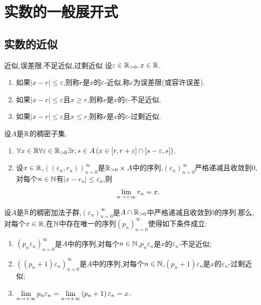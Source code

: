 \chapter{实数的一般展开式}

\section{实数的近似}

\begin{definition}{近似,误差限,不足近似,过剩近似}{}
	设$\varepsilon\in\mathbb{R}_{>0},x\in\mathbb{R}$.
	\begin{enumerate}
		\item 如果$\left|x-r\right|\leq\varepsilon$,则称$r$是$x$的$\varepsilon$-近似,称$\varepsilon$为误差限(或容许误差).
		\item 如果$\left|x-r\right|\leq\varepsilon$且$x\geq r$,则称$r$是$x$的$\varepsilon$-不足近似.
		\item 如果$\left|x-r\right|\leq\varepsilon$且$x\leq r$,则称$r$是$x$的$\varepsilon$-过剩近似.
	\end{enumerate}
\end{definition}

\begin{proposition}{}{}
	设$A$是$\mathbb{R}$的稠密子集.
	\begin{enumerate}
		\item $\forall x\in\mathbb{R}\forall\varepsilon\in\mathbb{R}_{>0}\exists r,s\in A\left(x\in\left[r,r+\varepsilon\right]\cap \left[s-\varepsilon,s\right]\right)$.
		\item 设$x\in\mathbb{R}$,$\left(\left(\varepsilon_{n},r_{n}\right)\right)_{n=0}^{\infty}$是$\mathbb{R}_{>0}\times A$中的序列,$\left(\varepsilon_{n}\right)_{n=0}^{\infty}$严格递减且收敛到$0$,对每个$n\in\mathbb{N}$有$\left|x-r_{n}\right|\leq\varepsilon_{n}$,则
		\begin{align*}
			\displaystyle\lim_{n\to +\infty}r_{n}=x.
		\end{align*}
	\end{enumerate}
\end{proposition}

\begin{proposition}{}{}
	设$A$是$\mathbb{R}$的稠密加法子群,$\left(\varepsilon_{n}\right)_{n=0}^{\infty}$是$A\cap\mathbb{R}_{>0}$中严格递减且收敛到$0$的序列.那么,对每个$x\in\mathbb{R}$,在$\mathbb{N}$中存在唯一的序列$\left(p_{n}\right)_{n=0}^{\infty}$使得如下条件成立:
	\begin{enumerate}
		\item $\left(p_{n}\varepsilon_{n}\right)_{n=0}^{\infty}$是$A$中的序列,对每个$n\in\mathbb{N}$,$p_{n}\varepsilon_{n}$是$x$的$\varepsilon_{n}$-不足近似;
		\item $\left(\left(p_{n}+1\right)\varepsilon_{n}\right)_{n=0}^{\infty}$是$A$中的序列,对每个$n\in\mathbb{N}$,$\left(p_{n}+1\right)\varepsilon_{n}$是$x$的$\varepsilon_{n}$-过剩近似;
		\item $\displaystyle\lim_{n\to +\infty}p_{n}\varepsilon_{n}=\displaystyle\lim_{n\to +\infty}\left(p_{n}+1\right)\varepsilon_{n}=x$.
	\end{enumerate}
\end{proposition}
